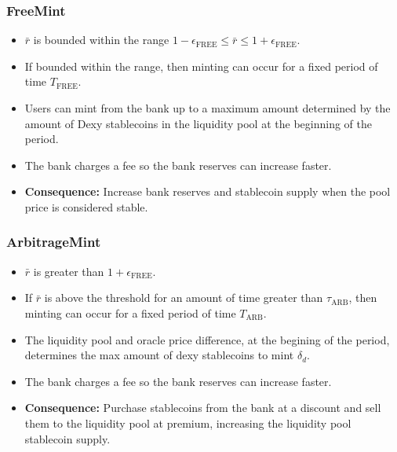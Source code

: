 \documentclass{ifcolog}
\newcommand{\rr}{\bar{r}}
\begin{document}
\subsubsection{FreeMint}
  \begin{itemize}
    \item $\rr$ is bounded within the range $1- \epsilon_{\textrm{FREE}} \le \rr \le 1+ \epsilon_{\textrm{FREE}}$.
    \item If bounded within the range, then minting can occur for a fixed period of time $T_{\textrm{FREE}}$.
    \item Users can mint from the bank up to a maximum amount determined by the amount of Dexy stablecoins in the liquidity pool at the beginning of the period.
    \item The bank charges a fee so the bank reserves can increase faster.
    \item \textbf{Consequence:} Increase bank reserves and stablecoin supply when the pool price is considered stable.
  \end{itemize}
  
\subsubsection{ArbitrageMint}
  \begin{itemize}
    \item $\rr$ is greater than $1 + \epsilon_{\textrm{FREE}}$.
    \item If $\rr$ is above the threshold for an amount of time greater than $\tau_{\textrm{ARB}}$,
          then minting can occur for a fixed period of time $T_{\textrm{ARB}}$.
    \item The liquidity pool and oracle price difference, at the begining of the period, determines the max amount of dexy stablecoins to mint $\delta_{d}$.
    \item The bank charges a fee so the bank reserves can increase faster.
    \item \textbf{Consequence:} Purchase stablecoins from the bank at a discount and sell them to the liquidity pool at premium, 
    increasing the liquidity pool stablecoin supply.
  \end{itemize}
\end{document}
